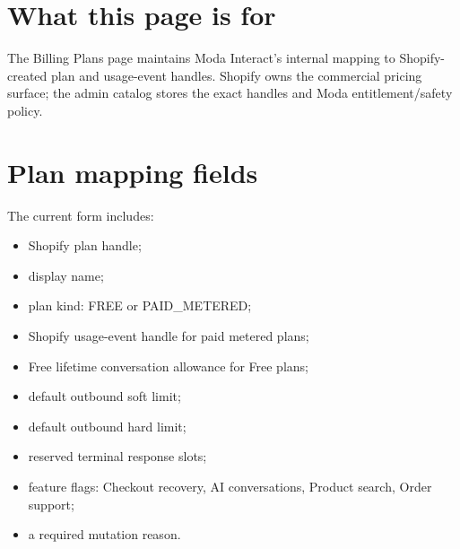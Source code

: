 \section{What this page is for}
The Billing Plans page maintains Moda Interact's internal mapping to Shopify-created plan and usage-event handles. Shopify owns the commercial pricing surface; the admin catalog stores the exact handles and Moda entitlement/safety policy.



\section{Plan mapping fields}
The current form includes:
\begin{itemize}
  \item Shopify plan handle;
  \item display name;
  \item plan kind: FREE or PAID\_METERED;
  \item Shopify usage-event handle for paid metered plans;
  \item Free lifetime conversation allowance for Free plans;
  \item default outbound soft limit;
  \item default outbound hard limit;
  \item reserved terminal response slots;
  \item feature flags: Checkout recovery, AI conversations, Product search, Order support;
  \item a required mutation reason.
\end{itemize}

